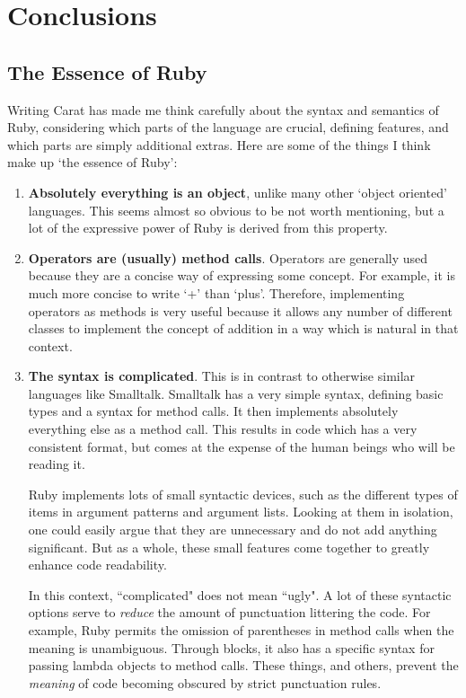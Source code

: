 \section{Conclusions}

\subsection{The Essence of Ruby}

Writing Carat has made me think carefully about the syntax and semantics of Ruby, considering which parts of the language are crucial, defining features, and which parts are simply additional extras. Here are some of the things I think make up `the essence of Ruby':

\begin{enumerate}
  \item \textbf{Absolutely everything is an object}, unlike many other `object oriented' languages. This seems almost so obvious to be not worth mentioning, but a lot of the expressive power of Ruby is derived from this property.
  
  \item \textbf{Operators are (usually) method calls}. Operators are generally used because they are a concise way of expressing some concept. For example, it is much more concise to write `+' than `plus'. Therefore, implementing operators as methods is very useful because it allows any number of different classes to implement the concept of addition in a way which is natural in that context.
  
  \item \textbf{The syntax is complicated}. This is in contrast to otherwise similar languages like Smalltalk. Smalltalk has a very simple syntax, defining basic types and a syntax for method calls. It then implements absolutely everything else as a method call. This results in code which has a very consistent format, but comes at the expense of the human beings who will be reading it.
  
  Ruby implements lots of small syntactic devices, such as the different types of items in argument patterns and argument lists. Looking at them in isolation, one could easily argue that they are unnecessary and do not add anything significant. But as a whole, these small features come together to greatly enhance code readability.
  
  In this context, ``complicated" does not mean ``ugly". A lot of these syntactic options serve to \emph{reduce} the amount of punctuation littering the code. For example, Ruby permits the omission of parentheses in method calls when the meaning is unambiguous. Through blocks, it also has a specific syntax for passing lambda objects to method calls. These things, and others, prevent the \emph{meaning} of code becoming obscured by strict punctuation rules.
  

\end{enumerate}
